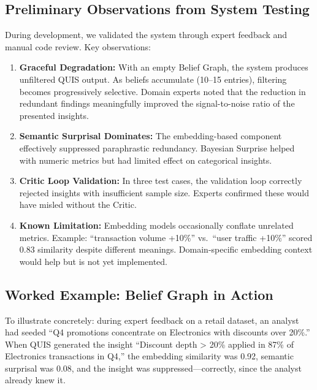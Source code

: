 \documentclass[conference]{IEEEtran}
\begin{document}
\subsection{Preliminary Observations from System Testing}

During development, we validated the system through expert feedback and
manual code review. Key observations:

\begin{enumerate}
  \item \textbf{Graceful Degradation:} With an empty Belief Graph, the
  system produces unfiltered QUIS output. As beliefs accumulate (10--15
  entries), filtering becomes progressively selective. Domain experts noted
  that the reduction in redundant findings meaningfully improved the
  signal-to-noise ratio of the presented insights.

  \item \textbf{Semantic Surprisal Dominates:} The embedding-based component
  effectively suppressed paraphrastic redundancy. Bayesian Surprise helped
  with numeric metrics but had limited effect on categorical insights.

  \item \textbf{Critic Loop Validation:} In three test cases, the validation
  loop correctly rejected insights with insufficient sample size. Experts
  confirmed these would have misled without the Critic.

  \item \textbf{Known Limitation:} Embedding models occasionally conflate
  unrelated metrics. Example: ``transaction volume +10\%'' vs.\ ``user
  traffic +10\%'' scored 0.83 similarity despite different meanings.
  Domain-specific embedding context would help but is not yet implemented.
\end{enumerate}

\subsection{Worked Example: Belief Graph in Action}

To illustrate concretely: during expert feedback on a retail dataset, an
analyst had seeded ``Q4 promotions concentrate on Electronics with discounts
over 20\%.'' When QUIS generated the insight ``Discount depth > 20\% applied
in 87\% of Electronics transactions in Q4,'' the embedding similarity was 0.92,
semantic surprisal was 0.08, and the insight was suppressed---correctly, since
the analyst already knew it.
\end{document}
